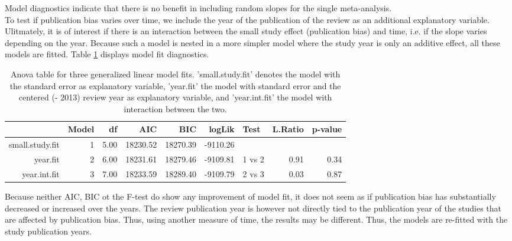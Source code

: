 \documentclass[11pt,a4paper,twoside]{book}\usepackage[]{graphicx}\usepackage[]{color}
\begin{document}
Model diagnostics indicate that there is no benefit in including random slopes for the single meta-analysis. \\
To test if publication bias varies over time, we include the year of the publication of the review as an additional explanatory variable. Ulitmately, it is of interest if there is an interaction between the small study effect (publication bias) and time, i.e. if the slope varies depending on the year. Because such a model is nested in a more simpler model where the study year is only an additive effect, all these models are fitted. Table \ref{anova.lme} displays model fit diagnostics.

\begin{table}[ht]
\centering
\begingroup\scriptsize
\begin{tabular}{rrrrrrlrr}
  \hline
 & Model & df & AIC & BIC & logLik & Test & L.Ratio & p-value \\ 
  \hline
small.study.fit &   1 & 5.00 & 18230.52 & 18270.39 & -9110.26 &  &  &  \\ 
  year.fit &   2 & 6.00 & 18231.61 & 18279.46 & -9109.81 & 1 vs 2 & 0.91 & 0.34 \\ 
  year.int.fit &   3 & 7.00 & 18233.59 & 18289.40 & -9109.79 & 2 vs 3 & 0.03 & 0.87 \\ 
   \hline
\end{tabular}
\endgroup
\caption{Anova table for three generalized linear model fits. 'small.study.fit' denotes the model with the standard error as explanatory variable, 'year.fit' the model with standard error and the centered (- 2013) review year as explanatory variable, and 'year.int.fit' the model with interaction between the two.} 
\label{anova.lme}
\end{table}


Because neither AIC, BIC ot the F-test do show any improvement of model fit, it does not seem as if publication bias has substantially decreased or increased over the years. The review publication year is however not directly tied to the publication year of the studies that are affected by publication bias. Thus, using another measure of time, the results may be different. Thus, the models are re-fitted with the study publication years.
\end{document}
